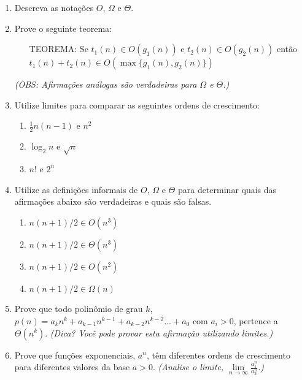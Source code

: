 \documentclass{article}
\begin{document}
\begin{enumerate}
    \item Descreva as notações $O$, $\Omega$ e $\Theta$.
    
    \item Prove o seguinte teorema:
    
    \begin{enumerate}
        \item[TEOREMA: ] Se $t_1(n) \in O(g_1(n))$ e $t_2(n) \in O(g_2(n))$ então $ t_1(n) + t_2(n) \in O(\max\{g_1(n),g_2(n)\}) $
    \end{enumerate}
    
    \textit{(OBS: Afirmações análogas são verdadeiras para $\Omega$ e $\Theta$.)}
    
    \item Utilize limites para comparar as seguintes ordens de crescimento:
    \begin{enumerate}
        \item $\frac{1}{2}n(n-1)$ e $n^2$
        \item $\log_2n$ e $\sqrt{n}$
        \item $n!$ e $2^n$
    \end{enumerate}
    
    \item Utilize as definições informais de $O$, $\Omega$ e $\Theta$ para determinar quais das afirmações abaixo são verdadeiras e quais são falsas.
    
    \begin{enumerate}
        \item $n(n+1)/2 \in O(n^3)$
        \item $n(n+1)/2 \in \Theta(n^3)$
        \item $n(n+1)/2 \in O(n^2)$
        \item $n(n+1)/2 \in \Omega(n)$
    \end{enumerate}
    
    
    \item Prove que todo polinômio de grau $k$, $p(n)=a_kn^k + a_{k-1}n^{k-1} + a_{k-2}n^{k-2} ...+ a_0$ com $a_i > 0$, pertence a $\Theta(n^k)$. \textit{(Dica? Você pode provar esta afirmação utilizando limites.)}

    \item Prove que funções exponenciais, $a^n$, têm diferentes ordens de crescimento para diferentes valores da base $a>0$. \textit{(Analise o limite, $\underset{n\rightarrow \infty}{\lim}\frac{a_1^n}{a_2^n}$.)}
    
    

\end{enumerate}
\end{document}
